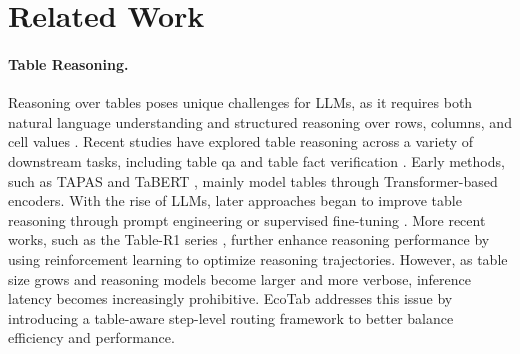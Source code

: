 \documentclass[11pt]{article}
\begin{document}

\section{Related Work}
\paragraph{Table Reasoning.} 
Reasoning over tables poses unique challenges for LLMs, as it requires both natural language understanding and structured reasoning over rows, columns, and cell values \citep{jin2022survey,zhang2025survey}. Recent studies \citep{chen2020hybridqa,deng2022turl,iida2021tabbie} have explored table reasoning across a variety of downstream tasks, including table qa \citep{chen2020hybridqa} and table fact verification \citep{parikh2020totto}. Early methods, such as TAPAS \citep{herzig2020tapas} and TaBERT \citep{yin2020tabert}, mainly model tables through Transformer-based encoders. With the rise of LLMs, later approaches began to improve table reasoning through prompt engineering \citep{sui2024tap4llm,wang2024chainoftable} or supervised fine-tuning \citep{su2024tablegpt2}. More recent works, such as the Table-R1 series \citep{yang2025table,wu2025table,jin2025table}, further enhance reasoning performance by using reinforcement learning to optimize reasoning trajectories. However, as table size grows and reasoning models become larger and more verbose, inference latency becomes increasingly prohibitive. EcoTab addresses this issue by introducing a table-aware step-level routing framework to better balance efficiency and performance.
\end{document}
